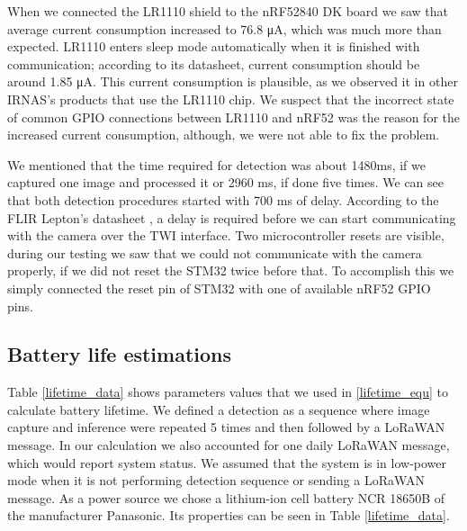 When we connected the LR1110 shield to the nRF52840 DK board we saw that average current consumption increased to 76.8 \si{\micro\ampere}, which was much more than expected.
LR1110 enters sleep mode automatically when it is finished with communication; according to its datasheet\cite{lr1110_datasheet}, current consumption should be around 1.85 \si{\micro\ampere}.
This current consumption is plausible, as we observed it in other IRNAS's products that use the LR1110 chip.
We suspect that the incorrect state of common GPIO connections between LR1110 and nRF52 was the reason for the increased current consumption, although, we were not able to fix the problem.

We mentioned that the time required for detection was about 1480\si{\milli\second}, if we captured one image and processed it or 2960 \si{\milli\second}, if done five times.
We can see that both detection procedures started with 700 \si{\milli\second} of delay.
According to the FLIR Lepton's datasheet \cite{flir_datasheet}, a delay is required before we can start communicating with the camera over the TWI interface.
Two microcontroller resets are visible, during our testing we saw that we could not communicate with the camera properly, if we did not reset the STM32 twice before that.
To accomplish this we simply connected the reset pin of STM32 with one of available nRF52 GPIO pins.


\subsection{ Battery life estimations}

Table \ref{lifetime_data} shows parameters values that we used in \ref{lifetime_equ} to calculate battery lifetime.
We defined a detection as a sequence where image capture and inference were repeated 5 times and then followed by a LoRaWAN message.
In our calculation we also accounted for one daily LoRaWAN message, which would report system status.
We assumed that the system is in low-power mode when it is not performing detection sequence or sending a LoRaWAN message.
As a power source we chose a lithium-ion cell battery NCR 18650B of the manufacturer Panasonic.
Its properties can be seen in Table \ref{lifetime_data}.

